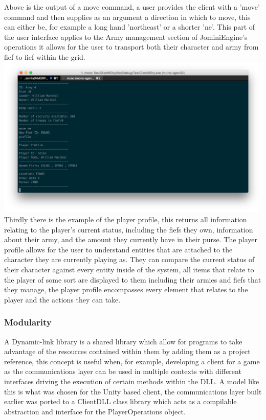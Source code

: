 \documentclass{article}
\begin{document}
Above is the output of a move command, a user provides the client with a 'move' command and then supplies as an argument a direction in which to move, this can either be, for example a long hand 'northeast' or a shorter 'ne'. This part of the user interface applies to the Army management section of JominiEngine's operations it allows for the user to transport both their character and army from fief to fief within the grid.\\
\includegraphics[width=\textwidth]{text5.png}
Thirdly there is the example of the player profile, this returns all information relating to the player's current status, including the fiefs they own, information about their army, and the amount they currently have in their purse. The player profile allows for the user to understand entities that are attached to the character they are currently playing as. They can compare the current status of their character against every entity inside of the system, all items that relate to the player of some sort are displayed to them including their armies and fiefs that they manage, the player profile encompasses every element that relates to the player and the actions they can take.
\subsubsection{Modularity}
A Dynamic-link library is a shared library which allow for programs to take advantage of the resources contained within them by adding them as a project reference, this concept is useful when, for example, developing a client for a game as the communications layer can be used in multiple contexts with different interfaces driving the execution of certain methods within the DLL. A model like this is what was chosen for the Unity based client, the communications layer built earlier was ported to a ClientDLL class library which acts as a compilable abstraction and interface for the PlayerOperations object.
\end{document}

